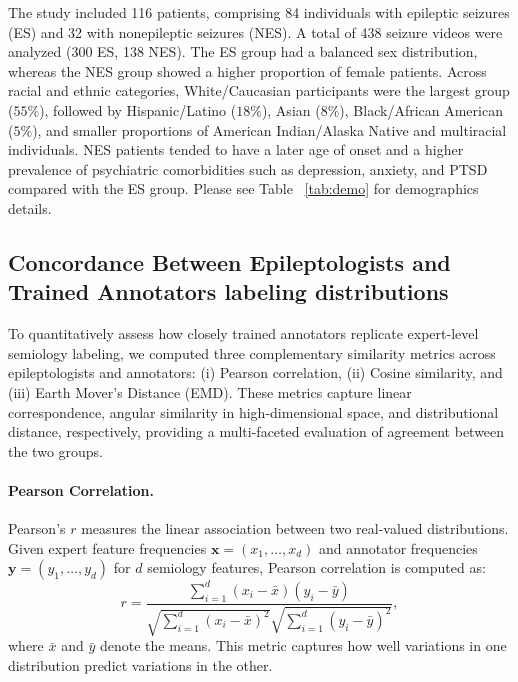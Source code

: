 \documentclass{article}
\theoremstyle{plain}
\theoremstyle{definition}
\theoremstyle{remark}
\begin{document}
The study included 116 patients, comprising 84 individuals with epileptic seizures (ES) and 32 with nonepileptic seizures (NES). A total of 438 seizure videos were analyzed (300 ES, 138 NES). The ES group had a balanced sex distribution, whereas the NES group showed a higher proportion of female patients. Across racial and ethnic categories, White/Caucasian participants were the largest group ($55\%$), followed by Hispanic/Latino ($18\%$), Asian ($8\%$), Black/African American ($5\%$), and smaller proportions of American Indian/Alaska Native and multiracial individuals. NES patients tended to have a later age of onset and a higher prevalence of psychiatric comorbidities such as depression, anxiety, and PTSD compared with the ES group. Please see Table ~\ref{tab:demo} for demographics details.



\subsection{Concordance Between Epileptologists and Trained Annotators labeling distributions}
\label{subsec:annot_conv}

To quantitatively assess how closely trained annotators replicate expert-level semiology labeling, we computed three complementary similarity metrics across epileptologists and annotators: (i) Pearson correlation, (ii) Cosine similarity, and (iii) Earth Mover's Distance (EMD). These metrics capture linear correspondence, angular similarity in high-dimensional space, and distributional distance, respectively, providing a multi-faceted evaluation of agreement between the two groups.

\vspace{0.3em}
\paragraph{Pearson Correlation.}
Pearson's $r$ measures the linear association between two real-valued distributions. Given expert feature frequencies 
$\mathbf{x} = (x_1,\ldots,x_d)$ and annotator frequencies $\mathbf{y} = (y_1,\ldots,y_d)$ for $d$ semiology features, Pearson correlation is computed as:
\[
    r = 
    \frac{\sum_{i=1}^{d} (x_i - \bar{x})(y_i - \bar{y})}
         {\sqrt{\sum_{i=1}^{d} (x_i - \bar{x})^2}
          \sqrt{\sum_{i=1}^{d} (y_i - \bar{y})^2}},
\]
where $\bar{x}$ and $\bar{y}$ denote the means. This metric captures how well variations in one distribution predict variations in the other.
\end{document}
